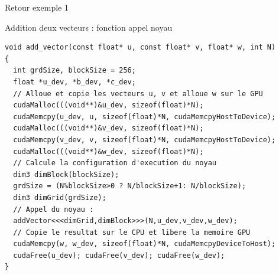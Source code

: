 \documentclass[handout,francais]{beamer}
\begin{document}
\begin{frame}[fragile]{Retour exemple 1}

\begin{block}{Addition deux vecteurs : fonction appel noyau}
 \begin{lstlisting}
void add_vector(const float* u, const float* v, float* w, int N) 
{
  int grdSize, blockSize = 256;
  float *u_dev, *b_dev, *c_dev;
  // Alloue et copie les vecteurs u, v et alloue w sur le GPU
  cudaMalloc(((void**)&u_dev, sizeof(float)*N);
  cudaMemcpy(u_dev, u, sizeof(float)*N, cudaMemcpyHostToDevice);  
  cudaMalloc(((void**)&v_dev, sizeof(float)*N);
  cudaMemcpy(v_dev, v, sizeof(float)*N, cudaMemcpyHostToDevice);  
  cudaMalloc(((void**)&w_dev, sizeof(float)*N);
  // Calcule la configuration d'execution du noyau
  dim3 dimBlock(blockSize);
  grdSize = (N%blockSize>0 ? N/blockSize+1: N/blockSize);
  dim3 dimGrid(grdSize);
  // Appel du noyau :
  addVector<<<dimGrid,dimBlock>>>(N,u_dev,v_dev,w_dev);  
  // Copie le resultat sur le CPU et libere la memoire GPU
  cudaMemcpy(w, w_dev, sizeof(float)*N, cudaMemcpyDeviceToHost);
  cudaFree(u_dev); cudaFree(v_dev); cudaFree(w_dev);  
}
\end{lstlisting}
\end{block}
\end{frame}
\end{document}
